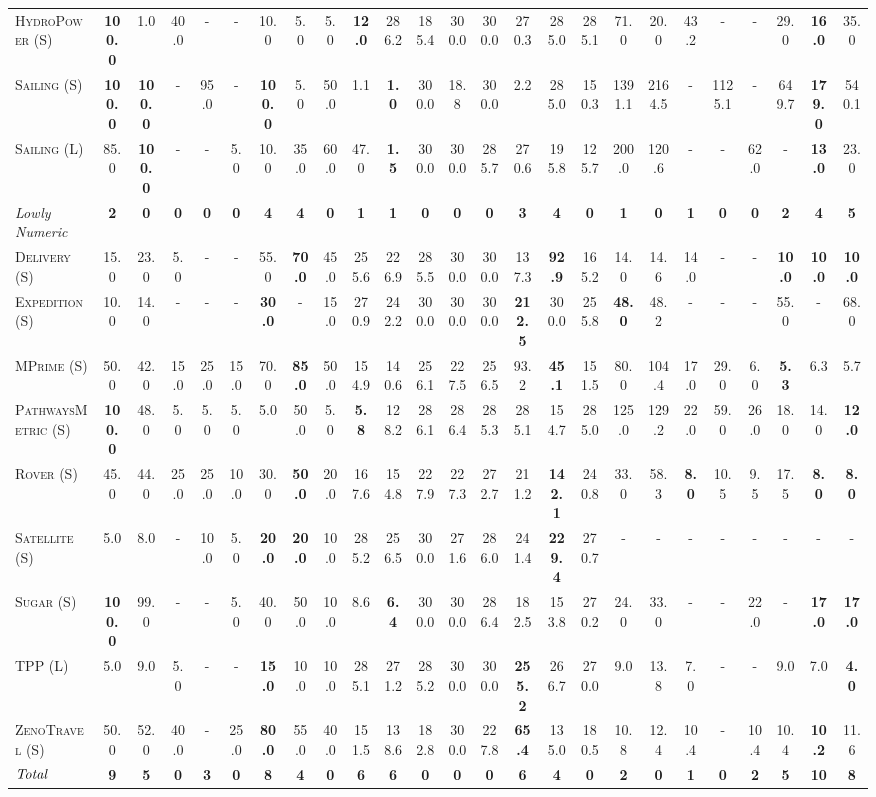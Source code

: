 \documentclass[11pt,landscape]{article}
\begin{document}
\begin{table}[tb]
{\begin{tabular}{|l||cccccccc||cccccccc||cccccccc||}
\textsc{HydroPower} (S)&\textbf{100.0}&1.0&40.0&-&-&10.0&5.0&5.0&\textbf{12.0}&286.2&185.4&300.0&300.0&270.3&285.0&285.1&71.0&20.0&43.2&-&-&29.0&\textbf{16.0}&35.0\\
\textsc{Sailing} (S)&\textbf{100.0}&\textbf{100.0}&-&95.0&-&\textbf{100.0}&5.0&50.0&1.1&\textbf{1.0}&300.0&18.8&300.0&2.2&285.0&150.3&1391.1&2164.5&-&1125.1&-&649.7&\textbf{179.0}&540.1\\
\textsc{Sailing} (L)&85.0&\textbf{100.0}&-&-&5.0&10.0&35.0&60.0&47.0&\textbf{1.5}&300.0&300.0&285.7&270.6&195.8&125.7&200.0&120.6&-&-&62.0&-&\textbf{13.0}&23.0
\\\hline
\textit{Lowly Numeric}&\textbf{2}&\textbf{0}&\textbf{0}&\textbf{0}&\textbf{0}&\textbf{4}&\textbf{4}&\textbf{0}&\textbf{1}&\textbf{1}&\textbf{0}&\textbf{0}&\textbf{0}&\textbf{3}&\textbf{4}&\textbf{0}&\textbf{1}&\textbf{0}&\textbf{1}&\textbf{0}&\textbf{0}&\textbf{2}&\textbf{4}&\textbf{5}\\\hline
\textsc{Delivery} (S)&15.0&23.0&5.0&-&-&55.0&\textbf{70.0}&45.0&255.6&226.9&285.5&300.0&300.0&137.3&\textbf{92.9}&165.2&14.0&14.6&14.0&-&-&\textbf{10.0}&\textbf{10.0}&\textbf{10.0}\\
\textsc{Expedition} (S)&10.0&14.0&-&-&-&\textbf{30.0}&-&15.0&270.9&242.2&300.0&300.0&300.0&\textbf{212.5}&300.0&255.8&\textbf{48.0}&48.2&-&-&-&55.0&-&68.0\\
\textsc{MPrime} (S)&50.0&42.0&15.0&25.0&15.0&70.0&\textbf{85.0}&50.0&154.9&140.6&256.1&227.5&256.5&93.2&\textbf{45.1}&151.5&80.0&104.4&17.0&29.0&6.0&\textbf{5.3}&6.3&5.7\\
\textsc{PathwaysMetric} (S)&\textbf{100.0}&48.0&5.0&5.0&5.0&5.0&50.0&5.0&\textbf{5.8}&128.2&286.1&286.4&285.3&285.1&154.7&285.0&125.0&129.2&22.0&59.0&26.0&18.0&14.0&\textbf{12.0}\\
\textsc{Rover} (S)&45.0&44.0&25.0&25.0&10.0&30.0&\textbf{50.0}&20.0&167.6&154.8&227.9&227.3&272.7&211.2&\textbf{142.1}&240.8&33.0&58.3&\textbf{8.0}&10.5&9.5&17.5&\textbf{8.0}&\textbf{8.0}\\
\textsc{Satellite} (S)&5.0&8.0&-&10.0&5.0&\textbf{20.0}&\textbf{20.0}&10.0&285.2&256.5&300.0&271.6&286.0&241.4&\textbf{229.4}&270.7&-&-&-&-&-&-&-&-\\
\textsc{Sugar} (S)&\textbf{100.0}&99.0&-&-&5.0&40.0&50.0&10.0&8.6&\textbf{6.4}&300.0&300.0&286.4&182.5&153.8&270.2&24.0&33.0&-&-&22.0&-&\textbf{17.0}&\textbf{17.0}\\
\textsc{TPP} (L)&5.0&9.0&5.0&-&-&\textbf{15.0}&10.0&10.0&285.1&271.2&285.2&300.0&300.0&\textbf{255.2}&266.7&270.0&9.0&13.8&7.0&-&-&9.0&7.0&\textbf{4.0}\\
\textsc{ZenoTravel} (S)&50.0&52.0&40.0&-&25.0&\textbf{80.0}&55.0&40.0&151.5&138.6&182.8&300.0&227.8&\textbf{65.4}&135.0&180.5&10.8&12.4&10.4&-&10.4&10.4&\textbf{10.2}&11.6
\\\hline
$\emph{Total}$&\textbf{9}&\textbf{5}&\textbf{0}&\textbf{3}&\textbf{0}&\textbf{8}&\textbf{4}&\textbf{0}&\textbf{6}&\textbf{6}&\textbf{0}&\textbf{0}&\textbf{0}&\textbf{6}&\textbf{4}&\textbf{0}&\textbf{2}&\textbf{0}&\textbf{1}&\textbf{0}&\textbf{2}&\textbf{5}&\textbf{10}&\textbf{8}\\\hline


\end{tabular}}
\end{table}
\end{document}
